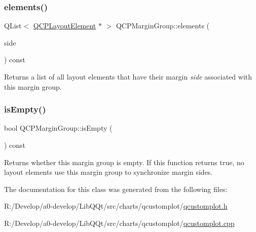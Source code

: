 \subsubsection{\texorpdfstring{elements()}{elements()}}
{\footnotesize\ttfamily Q\+List$<$ \mbox{\hyperlink{class_q_c_p_layout_element}{Q\+C\+P\+Layout\+Element}} $\ast$ $>$ Q\+C\+P\+Margin\+Group\+::elements (\begin{DoxyParamCaption}\item[{\mbox{\hyperlink{namespace_q_c_p_a7e487e3e2ccb62ab7771065bab7cae54}{Q\+C\+P\+::\+Margin\+Side}}}]{side }\end{DoxyParamCaption}) const\hspace{0.3cm}{\ttfamily [inline]}}

Returns a list of all layout elements that have their margin {\itshape side} associated with this margin group. \mbox{\label{class_q_c_p_margin_group_ae0d32656d8a5fc5690c4e7693f9d0539}} 
\subsubsection{\texorpdfstring{is\+Empty()}{isEmpty()}}
{\footnotesize\ttfamily bool Q\+C\+P\+Margin\+Group\+::is\+Empty (\begin{DoxyParamCaption}{ }\end{DoxyParamCaption}) const}

Returns whether this margin group is empty. If this function returns true, no layout elements use this margin group to synchronize margin sides. 

The documentation for this class was generated from the following files\+:\begin{DoxyCompactItemize}
\item 
R\+:/\+Develop/a0-\/develop/\+Lib\+Q\+Qt/src/charts/qcustomplot/\mbox{\hyperlink{qcustomplot_8h}{qcustomplot.\+h}}\item 
R\+:/\+Develop/a0-\/develop/\+Lib\+Q\+Qt/src/charts/qcustomplot/\mbox{\hyperlink{qcustomplot_8cpp}{qcustomplot.\+cpp}}\end{DoxyCompactItemize}
